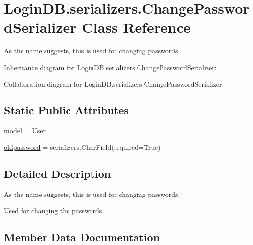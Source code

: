 \hypertarget{class_login_d_b_1_1serializers_1_1_change_password_serializer}{}\section{Login\+D\+B.\+serializers.\+Change\+Password\+Serializer Class Reference}
\label{class_login_d_b_1_1serializers_1_1_change_password_serializer}


As the name suggests, this is used for changing passwords.  




Inheritance diagram for Login\+D\+B.\+serializers.\+Change\+Password\+Serializer\+:


Collaboration diagram for Login\+D\+B.\+serializers.\+Change\+Password\+Serializer\+:
\subsection*{Static Public Attributes}
\begin{DoxyCompactItemize}
\item 
\hyperlink{class_login_d_b_1_1serializers_1_1_change_password_serializer_a67890622437be99c56c86796a28bc65a}{model} = User
\item 
\hyperlink{class_login_d_b_1_1serializers_1_1_change_password_serializer_a144431e953e6b69f5f85820cb2a3784a}{oldpassword} = serializers.\+Char\+Field(required=True)
\end{DoxyCompactItemize}


\subsection{Detailed Description}
As the name suggests, this is used for changing passwords. 

\begin{DoxyVerb}Used for changing the passwords.
\end{DoxyVerb}
 

\subsection{Member Data Documentation}
\mbox{\label{class_login_d_b_1_1serializers_1_1_change_password_serializer_a67890622437be99c56c86796a28bc65a}} 
